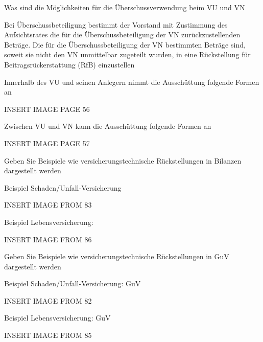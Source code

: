 Was sind die Möglichkeiten für die Überschussverwendung beim VU und VN

Bei Überschussbeteiligung bestimmt der Vorstand mit Zustimmung des Aufsichtsrates die für die Überschussbeteiligung der VN
zurückzustellenden Beträge.
Die für die Überschussbeteiligung der VN bestimmten Beträge sind, soweit sie nicht den VN unmittelbar zugeteilt wurden, in eine
Rückstellung für Beitragsrückerstattung (RfB) einzustellen

Innerhalb des VU und seinen Anlegern nimmt die Ausschüttung folgende Formen an

INSERT IMAGE PAGE 56


Zwischen VU und VN kann die Ausschüttung folgende Formen an

INSERT IMAGE PAGE 57


  

Geben Sie Beispiele wie versicherungstechnische Rückstellungen in Bilanzen dargestellt werden

Beispiel Schaden/Unfall-Versicherung

INSERT IMAGE FROM 83


Beispiel Lebensversicherung:


INSERT IMAGE FROM 86



Geben Sie Beispiele wie versicherungstechnische Rückstellungen in GuV dargestellt werden

Beispiel Schaden/Unfall-Versicherung: GuV


INSERT IMAGE FROM 82


Beispiel Lebensversicherung: GuV


INSERT IMAGE FROM 85
